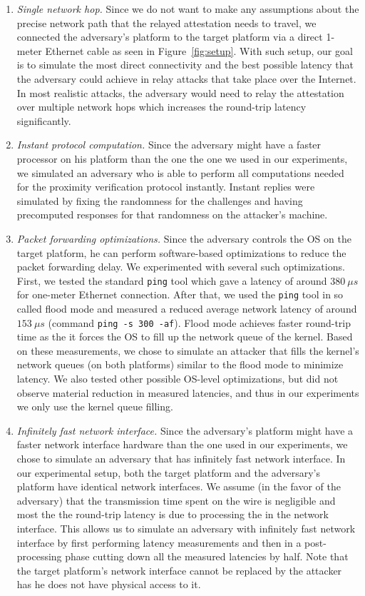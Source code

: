 \begin{enumerate}
	\item \emph{Single network hop.} Since we do not want to make any assumptions about the precise network path that the relayed attestation needs to travel, we connected the adversary's platform to the target platform via a direct 1-meter Ethernet cable as seen in Figure~\ref{fig:setup}. With such setup, our goal is to simulate the most direct connectivity and the best possible latency that the adversary could achieve in relay attacks that take place over the Internet. In most realistic attacks, the adversary would need to relay the attestation over multiple network hops which increases the round-trip latency significantly. 

	\item \emph{Instant protocol computation.} Since the adversary might have a faster processor on his platform than the one the one we used in our experiments, we simulated an adversary who is able to perform all computations needed for the proximity verification protocol instantly. Instant replies were simulated by fixing the randomness for the challenges and having precomputed responses for that randomness on the attacker's machine.

	\item \emph{Packet forwarding optimizations.} Since the adversary controls the OS on the target platform, he can perform software-based optimizations to reduce the packet forwarding delay. We experimented with several such optimizations. First, we tested the standard \texttt{ping} tool which gave a latency of around $380\ \mu s$ for one-meter Ethernet connection. After that, we used the \texttt{ping} tool in so called flood mode and measured a reduced average network latency of around $153\ \mu s$ (command \texttt{ping -s 300 -af}). Flood mode achieves faster round-trip time as the it forces the OS to fill up the network queue of the kernel. Based on these measurements, we chose to simulate an attacker that fills the kernel's network queues (on both platforms) similar to the flood mode to minimize latency. We also tested other possible OS-level optimizations, but did not observe material reduction in measured latencies, and thus in our experiments we only use the kernel queue filling.
	
	\item \emph{Infinitely fast network interface.} Since the adversary's platform might have a faster network interface hardware than the one used in our experiments, we chose to simulate an adversary that has infinitely fast network interface. In our experimental setup, both the target platform and the adversary's platform have identical network interfaces. We assume (in the favor of the adversary) that the transmission time spent on the wire is negligible and most the the round-trip latency is due to processing the in the network interface. This allows us to simulate an adversary with infinitely fast network interface by first performing latency measurements and then in a post-processing phase cutting down all the measured latencies by half. Note that the target platform's network interface cannot be replaced by the attacker has he does not have physical access to it.
\end{enumerate}

